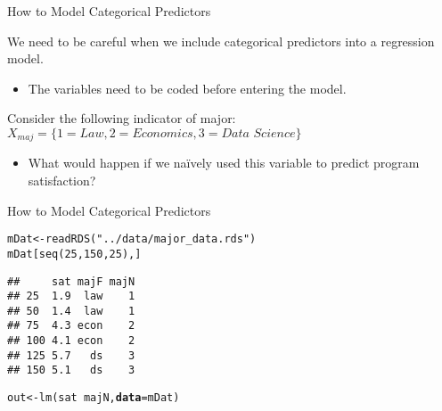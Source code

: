 \documentclass{beamer}\usepackage[]{graphicx}\usepackage[]{color}
\makeatletter
\newcommand{\hlnum}[1]{\textcolor[rgb]{0.69,0.494,0}{#1}}%
\newcommand{\hlstr}[1]{\textcolor[rgb]{0.749,0.012,0.012}{#1}}%
\newcommand{\hlopt}[1]{\textcolor[rgb]{0,0,0}{#1}}%
\newcommand{\hlstd}[1]{\textcolor[rgb]{0,0,0}{#1}}%
\newcommand{\hlkwb}[1]{\textcolor[rgb]{0,0.341,0.682}{#1}}%
\newcommand{\hlkwc}[1]{\textcolor[rgb]{0,0,0}{\textbf{#1}}}%
\newcommand{\hlkwd}[1]{\textcolor[rgb]{0.004,0.004,0.506}{#1}}%
\newenvironment{kframe}{%
 \def\at@end@of@kframe{}%
 \ifinner\ifhmode%
  \def\at@end@of@kframe{\end{minipage}}%
  \begin{minipage}{\columnwidth}%
 \fi\fi%
 \def\FrameCommand##1{\hskip\@totalleftmargin \hskip-\fboxsep
 \colorbox{shadecolor}{##1}\hskip-\fboxsep
     \hskip-\linewidth \hskip-\@totalleftmargin \hskip\columnwidth}%
 \MakeFramed {\advance\hsize-\width
   \@totalleftmargin\z@ \linewidth\hsize
   \@setminipage}}%
 {\par\unskip\endMakeFramed%
 \at@end@of@kframe}
\newenvironment{knitrout}{}{} %
\makeatother
\begin{document}
\begin{frame}{How to Model Categorical Predictors}
  
  We need to be careful when we include categorical predictors into a regression
  model.
  \vc
  \begin{itemize}
  \item The variables need to be coded before entering the model.
  \end{itemize}
  \vb 
  Consider the following indicator of major: 
  $X_{maj} = \{1 = \textit{Law}, 2 = \textit{Economics}, 
  3 = \textit{Data Science}\}$ 
  \vc
  \begin{itemize}
    \item What would happen if we na\"ively used this variable to predict
      program satisfaction?
  \end{itemize}
  
\end{frame}

\watermarkoff %

\begin{frame}[fragile]{How to Model Categorical Predictors}
  
\begin{knitrout}\footnotesize
{}\color{fgcolor}\begin{kframe}
\begin{alltt}
\hlstd{mDat} \hlkwb{<-} \hlkwd{readRDS}\hlstd{(}\hlstr{"../data/major_data.rds"}\hlstd{)}
\hlstd{mDat[}\hlkwd{seq}\hlstd{(}\hlnum{25}\hlstd{,} \hlnum{150}\hlstd{,} \hlnum{25}\hlstd{), ]}
\end{alltt}
\begin{verbatim}
##     sat majF majN
## 25  1.9  law    1
## 50  1.4  law    1
## 75  4.3 econ    2
## 100 4.1 econ    2
## 125 5.7   ds    3
## 150 5.1   ds    3
\end{verbatim}
\begin{alltt}
\hlstd{out} \hlkwb{<-} \hlkwd{lm}\hlstd{(sat} \hlopt{~} \hlstd{majN,} \hlkwc{data} \hlstd{= mDat)}
\end{alltt}
\end{kframe}
\end{knitrout}

\end{frame}

\end{document}
